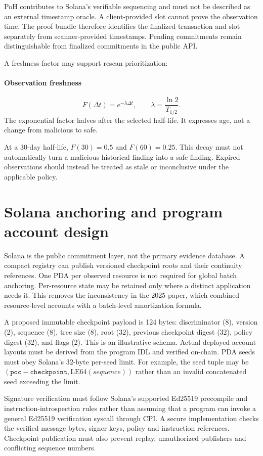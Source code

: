 \documentclass[10pt,a4paper]{article}
\begin{document}
PoH contributes to Solana's verifiable sequencing and must not be described as an external timestamp oracle. A client-provided slot cannot prove the observation time. The proof bundle therefore identifies the finalized transaction and slot separately from scanner-provided timestamps. Pending commitments remain distinguishable from finalized commitments in the public API.


A freshness factor may support rescan prioritization:


\paragraph{Observation freshness}
\[F(\Delta t)=e^{-\lambda\Delta t},\qquad\lambda=\frac{\ln 2}{T_{1/2}}.\]
The exponential factor halves after the selected half-life. It expresses age, not a change from malicious to safe.


At a 30-day half-life, \(F(30)=0.5\) and \(F(60)=0.25\). This decay must not automatically turn a malicious historical finding into a safe finding. Expired observations should instead be treated as stale or inconclusive under the applicable policy.


\section*{Solana anchoring and program account design}
Solana is the public commitment layer, not the primary evidence database. A compact registry can publish versioned checkpoint roots and their continuity references. One PDA per observed resource is not required for global batch anchoring. Per-resource state may be retained only where a distinct application needs it. This removes the inconsistency in the 2025 paper, which combined resource-level accounts with a batch-level amortization formula.


A proposed immutable checkpoint payload is 124 bytes: discriminator (8), version (2), sequence (8), tree size (8), root (32), previous checkpoint digest (32), policy digest (32), and flags (2). This is an illustrative schema. Actual deployed account layouts must be derived from the program IDL and verified on-chain. PDA seeds must obey Solana's 32-byte per-seed limit. For example, the seed tuple may be \((\mathtt{poc-checkpoint},\mathrm{LE64}(sequence))\) rather than an invalid concatenated seed exceeding the limit.


Signature verification must follow Solana's supported Ed25519 precompile and instruction-introspection rules rather than assuming that a program can invoke a general Ed25519 verification syscall through CPI. A secure implementation checks the verified message bytes, signer keys, policy and instruction references. Checkpoint publication must also prevent replay, unauthorized publishers and conflicting sequence numbers.
\end{document}
